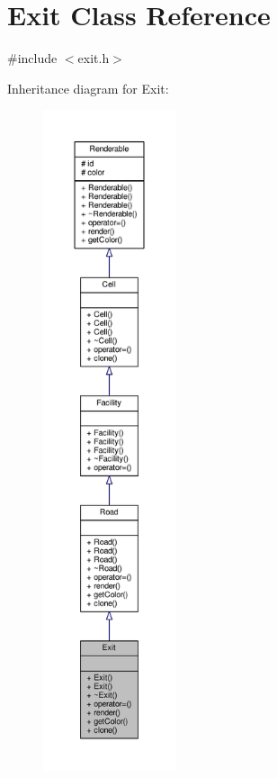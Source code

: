 \hypertarget{classExit}{}\section{Exit Class Reference}
\label{classExit}


{\ttfamily \#include $<$exit.\+h$>$}



Inheritance diagram for Exit\+:
\nopagebreak
\begin{figure}[H]
\begin{center}
\leavevmode
\includegraphics[height=550pt]{classExit__inherit__graph}
\end{center}
\end{figure}


